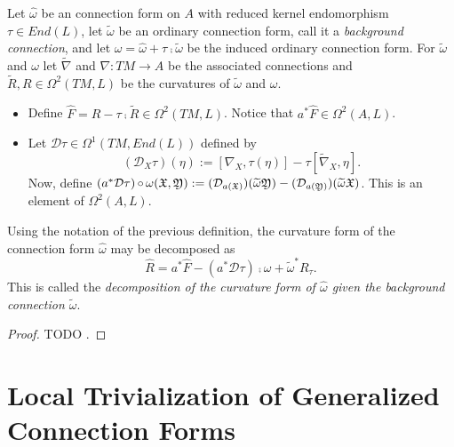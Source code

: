 \begin{definition}\label{definitionIngredientsCurvatureDecompositionConnection}
Let $\hat \omega$ be an connection form on $A$ with reduced kernel endomorphism $\tau \in End(L)$, let $\tilde \omega$ be an ordinary connection form, call it a \emph{background connection}, and let $\omega = \hat \omega + \tau \comp \tilde \omega$ be the induced ordinary connection form. For $\tilde \omega$ and $\omega$ let $\tilde \nabla$ and $\nabla: TM \to A$ be the associated connections and $\tilde R, R \in \Omega^2(TM, L)$ be the curvatures of $\tilde \omega$ and $\omega$.

    \begin{itemize}
        
    \item Define $\hat F = R - \tau \comp \tilde R \in \Omega^2(TM, L)$. Notice that $a^* \hat F \in \Omega^2(A, L)$.
    
    \item Let $\mathcal D \tau \in \Omega^1(TM, End(L))$ defined by
        \begin{equation}
            (\mathcal D_X \tau)(\eta) := [\nabla_X, \tau(\eta)] - \tau[\tilde \nabla_X, \eta].
        \end{equation}
        Now, define $(a^* \mathcal D \tau)\operatorname{\circ} \omega (\mathfrak{X}, \mathfrak{Y}) := (\mathcal D_{a(\mathfrak{X})})(\widetilde \omega \mathfrak{Y}) - (\mathcal D_{a(\mathfrak{Y})})(\widetilde \omega \mathfrak{X})$. This is an element of $\Omega^2(A, L)$.
        
    \end{itemize}
\end{definition}

\begin{theorem}
Using the notation of the previous definition, the curvature form of the connection form $\hat \omega$ may be decomposed as
\begin{equation}
    \hat R = a^* \hat F - (a^* \mathcal D \tau)\comp \omega + \tilde \omega ^* R_\tau.
\end{equation}
This is called the \emph{decomposition of the curvature form of $\hat \omega$ given the background connection $\tilde \omega$}.
\end{theorem}
\begin{proof}
TODO \todo{}.
\end{proof}

\section{Local Trivialization of Generalized Connection Forms}

